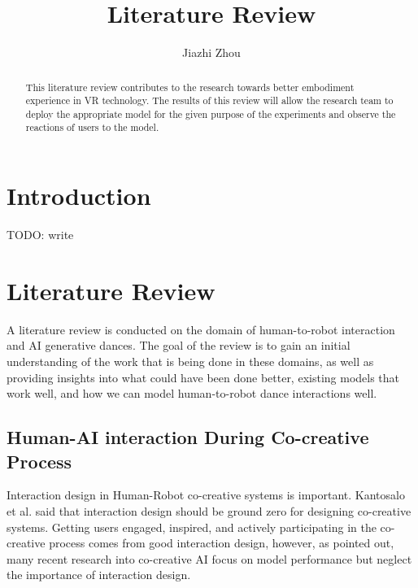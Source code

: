 \documentclass[final,5p,times,twocolumn,authoryear]{article}
\begin{document}
\title{Literature Review}
\author{Jiazhi Zhou}
\maketitle

\begin{abstract}

This literature review contributes to the research towards better
embodiment experience in VR technology. The results of this review will
allow the research team to deploy the appropriate model for the given
purpose of the experiments and observe the reactions of users to the
model.

\end{abstract}

\section{Introduction}

TODO: write

\section{Literature Review}

A literature review is conducted on the domain of human-to-robot
interaction and AI generative dances. The goal of the review is to gain
an initial understanding of the work that is being done in these
domains, as well as providing insights into what could have been done
better, existing models that work well, and how we can model
human-to-robot dance interactions well.

\subsection{Human-AI interaction During Co-creative Process}

Interaction design in Human-Robot co-creative systems is important.
Kantosalo et al. \cite{Kantosalo2020} said that interaction design should be
ground zero for designing co-creative systems. Getting users engaged,
inspired, and actively participating in the co-creative process comes
from good interaction design, however, as \cite{Rezwana2023} pointed
out, many recent research into co-creative AI focus on model performance
but neglect the importance of interaction design.
\end{document}
